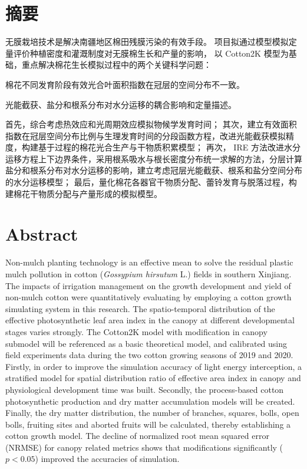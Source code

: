 \chapter*{摘要}
无膜栽培技术是解决南疆地区棉田残膜污染的有效手段。
项目拟通过模型模拟定量评价种植密度和灌溉制度对无膜棉生长和产量的影响，
以 Cotton2K 模型为基础，重点解决棉花生长模拟过程中的两个关键科学问题：
\begin{enumerate*}
    \item 棉花不同发育阶段有效光合叶面积指数在冠层的空间分布不一致。
    \item 光能截获、盐分和根系分布对水分运移的耦合影响和定量描述。
\end{enumerate*}
首先，综合考虑热效应和光周期效应模拟物候学发育时间；
其次，建立有效面积指数在冠层空间分布比例与生理发育时间的分段函数方程，改进光能截获模拟精度，构建基于过程的棉花光合生产与干物质积累模型；
再次， IRE 方法改进水分运移方程上下边界条件，采用根系吸水与根长密度分布统一求解的方法，分层计算盐分和根系分布对水分运移的影响，建立考虑冠层光能截获、根系和盐分空间分布的水分运移模型；
最后，量化棉花各器官干物质分配、蕾铃发育与脱落过程，构建棉花干物质分配与产量形成的模拟模型。

\chapter*{Abstract}
Non-mulch planting technology is an effective mean to solve the residual plastic mulch pollution in cotton (\textit{Gossypium hirsutum} L.) fields in southern Xinjiang.
The impacts of irrigation management on the growth development and yield of non-mulch cotton were quantitatively evaluating by employing a cotton growth simulating system in this research.
The spatio-temporal distribution of the effective photosynthetic leaf area index in the canopy at different developmental stages varies strongly.
The Cotton2K model with modification in canopy submodel will be referenced as a basic theoretical model, and calibrated using field experiments data during the two cotton growing seasons of 2019 and 2020.
Firstly, in order to improve the simulation accuracy of light energy interception, a stratified model for spatial distribution ratio of effective area index in canopy and physiological development time was built.
Secondly, the process-based cotton photosynthetic production and dry matter accumulation models will be created.
Finally, the dry matter distribution, the number of branches, squares, bolls, open bolls, fruiting sites and aborted fruits will be calculated, thereby establishing a cotton growth model.
The decline of normalized root mean squared error (NRMSE) for canopy related metrics shows that modifications significantly ($p < 0.05$) improved the accuracies of simulation.

